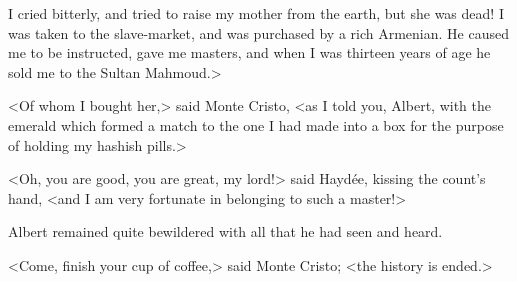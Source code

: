 I cried bitterly, and tried to raise my mother from the earth, but she was dead! I was taken to the slave-market, and was purchased by a rich Armenian. He caused me to be instructed, gave me masters, and when I was thirteen years of age he sold me to the Sultan Mahmoud.> 

 <Of whom I bought her,> said Monte Cristo, <as I told you, Albert, with the emerald which formed a match to the one I had made into a box for the purpose of holding my hashish pills.> 

 <Oh, you are good, you are great, my lord!> said Haydée, kissing the count's hand, <and I am very fortunate in belonging to such a master!> 

 Albert remained quite bewildered with all that he had seen and heard. 

 <Come, finish your cup of coffee,> said Monte Cristo; <the history is ended.> 